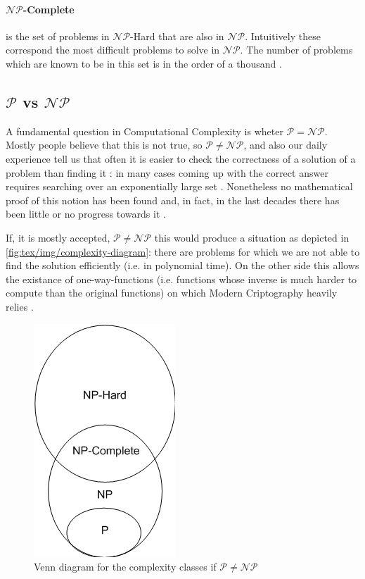 \paragraph{$\mathcal{NP} $-Complete}%
\label{par:_np_hard} is the set of problems in $\mathcal{NP} $-Hard that are
also in $\mathcal{NP} $. Intuitively these correspond the most difficult
problems to solve in $\mathcal{NP} $. The number of problems which are known to
be in this set is in the order of a thousand \cite{SanjeevArora2017}.

\subsection{$\mathcal{P} $ vs $\mathcal{NP}$}%
\label{sub:_p_vs_np_}

A fundamental question in Computational Complexity is wheter $\mathcal{P} =
	\mathcal{NP} $. Mostly people believe that this is not true, so
$\mathcal{P} \neq \mathcal{NP} $, and also our daily experience tell us that
often it is easier to check the correctness of a solution of a problem than
finding it \cite{9780521884730}: in many cases coming up with the correct
answer requires searching over an exponentially large set
\cite{SanjeevArora2017}. Nonetheless no mathematical proof of this notion has
been found and, in fact, in the last decades there has been little or no progress towards it \cite{Erickson2019}.

If, it is mostly accepted, $\mathcal{P} \neq \mathcal{NP} $ this would produce
a situation as depicted in \autoref{fig:tex/img/complexity-diagram}:
there are problems for which we are not able to find the solution
efficiently (i.e. in polynomial time). On the other side this allows the
existance of one-way-functions (i.e. functions whose inverse is much harder to
compute than the original functions) on which Modern Criptography heavily
relies \cite{9780521884730}.
%


\begin{figure}
	\centering
	\includegraphics[width=0.3\linewidth]{tex/img/complexity-diagram.png}
	\caption{Venn diagram for the complexity classes if $\mathcal{P} \neq
			\mathcal{NP} $ \cite{article}}%
	\label{fig:tex/img/complexity-diagram}
\end{figure}

